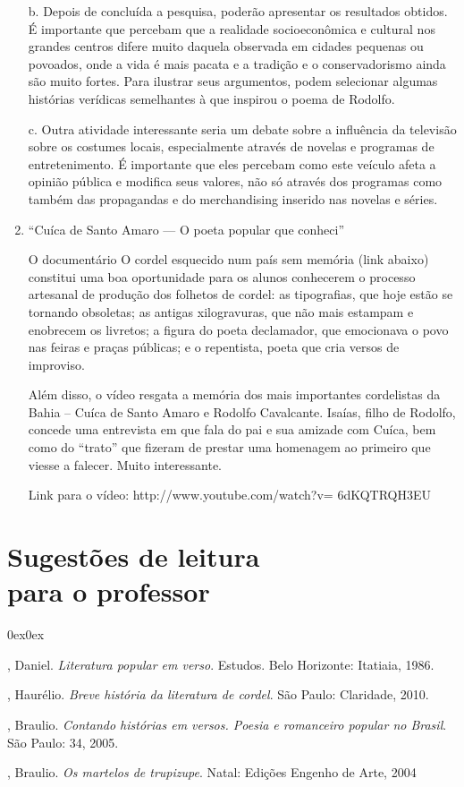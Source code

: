 \begin{enumerate}
b. Depois de concluída a pesquisa, poderão apresentar os resultados
obtidos. É importante que percebam que a realidade socioeconômica e
cultural nos grandes centros difere muito daquela observada em cidades
pequenas ou povoados, onde a vida é mais pacata e a tradição e o
conservadorismo ainda são muito fortes. Para ilustrar seus argumentos,
podem selecionar algumas histórias verídicas semelhantes à que inspirou
o poema de Rodolfo. 

c. Outra atividade interessante seria um debate sobre a influência da
televisão sobre os costumes locais, especialmente através de novelas e
programas de entretenimento. É importante que eles percebam como este
veículo afeta a opinião pública e modifica seus valores, não só através
dos programas como também das propagandas e do merchandising inserido
nas novelas e séries.

\item “Cuíca de Santo Amaro — O poeta popular que conheci”

O documentário O cordel esquecido num país sem memória (link abaixo)
constitui uma boa oportunidade para os alunos conhecerem o processo
artesanal de produção dos folhetos de cordel: as tipografias, que hoje
estão se tornando obsoletas; as antigas xilogravuras, que não mais
estampam e enobrecem os livretos; a figura do poeta declamador, que
emocionava o povo nas feiras e praças públicas; e o repentista, poeta
que cria versos de improviso.

Além disso, o vídeo resgata a memória dos mais importantes cordelistas
da Bahia – Cuíca de Santo Amaro e Rodolfo Cavalcante. Isaías, filho de
Rodolfo, concede uma entrevista em que fala do pai e sua amizade com
Cuíca, bem como do “trato” que fizeram de prestar uma homenagem ao
primeiro que viesse a falecer. Muito interessante.

Link para o vídeo: http://www.youtube.com/watch?v= 6dKQTRQH3EU

\end{enumerate}

\section{Sugestões de leitura\\ para o professor} 

\begin{description}0ex\parsep0ex

, Daniel. \textit{Literatura popular em verso}. Estudos. Belo Horizonte: Itatiaia, 1986. 

, Haurélio. \textit{Breve história da literatura de cordel}. São Paulo: Claridade, 2010.

, Braulio. \textit{Contando histórias em versos. Poesia e romanceiro popular no Brasil}. São Paulo: 34, 2005.

, Braulio. \textit{Os martelos de trupizupe}. Natal: Edições Engenho de Arte, 2004 

\end{description}